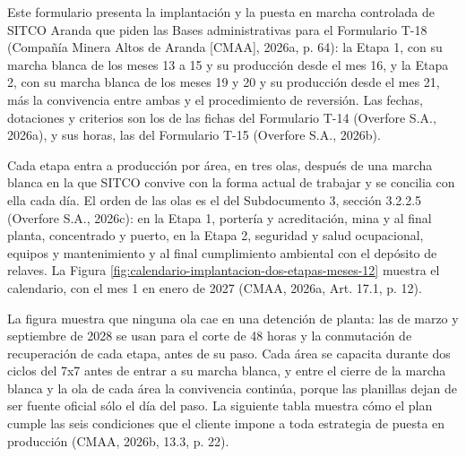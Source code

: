 \documentclass[formulario]{../../comun/overfore}
\begin{document}
Este formulario presenta la implantación y la puesta en marcha controlada de SITCO Aranda que piden las Bases administrativas para el Formulario T-18 (Compañía Minera Altos de Aranda [CMAA], 2026a, p. 64): la Etapa 1, con su marcha blanca de los meses 13 a 15 y su producción desde el mes 16, y la Etapa 2, con su marcha blanca de los meses 19 y 20 y su producción desde el mes 21, más la convivencia entre ambas y el procedimiento de reversión. Las fechas, dotaciones y criterios son los de las fichas del Formulario T-14 (Overfore S.A., 2026a), y sus horas, las del Formulario T-15 (Overfore S.A., 2026b).

Cada etapa entra a producción por área, en tres olas, después de una marcha blanca en la que SITCO convive con la forma actual de trabajar y se concilia con ella cada día. El orden de las olas es el del Subdocumento 3, sección 3.2.2.5 (Overfore S.A., 2026c): en la Etapa 1, portería y acreditación, mina y al final planta, concentrado y puerto, en la Etapa 2, seguridad y salud ocupacional, equipos y mantenimiento y al final cumplimiento ambiental con el depósito de relaves. La Figura \ref{fig:calendario-implantacion-dos-etapas-meses-12} muestra el calendario, con el mes 1 en enero de 2027 (CMAA, 2026a, Art. 17.1, p. 12).

La figura muestra que ninguna ola cae en una detención de planta: las de marzo y septiembre de 2028 se usan para el corte de 48 horas y la conmutación de recuperación de cada etapa, antes de su paso. Cada área se capacita durante dos ciclos del 7x7 antes de entrar a su marcha blanca, y entre el cierre de la marcha blanca y la ola de cada área la convivencia continúa, porque las planillas dejan de ser fuente oficial sólo el día del paso. La siguiente tabla muestra cómo el plan cumple las seis condiciones que el cliente impone a toda estrategia de puesta en producción (CMAA, 2026b, 13.3, p. 22).
\end{document}
